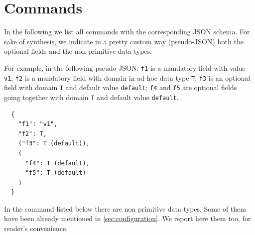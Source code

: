 \section{Commands}
\label{sec:commands}

In the following we list all commands with the corresponding JSON schema.
For sake of synthesis, we indicate in a pretty custom way (pseudo-JSON) both the optional fields and the non primitive data types.

For example, in the following pseudo-JSON: \texttt{f1} is a mandatory field with value \texttt{v1}; \texttt{f2} is a mandatory field with domain in ad-hoc data type \texttt{T}; \texttt{f3} is an optional field with domain \texttt{T} and default value \texttt{default}; \texttt{f4} and \texttt{f5} are optional fields going together with domain \texttt{T} and default value \texttt{default}.

\begin{verbatim}
  {
    "f1": "v1",
    "f2": T,
    ("f3": T (default)),
    (
      "f4": T (default),
      "f5": T (default)
    )
  }
\end{verbatim}

In the command listed below there are non primitive data types. Some of them have been already mentioned in \ref{sec:configuration}. We report here them too, for reader's convenience.


